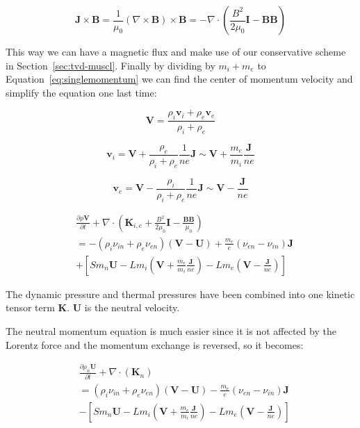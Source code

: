 \documentclass[12pt,upcase]{umlthesis}
\begin{document}
\begin{equation}
	\textbf{J} \times \textbf{B} = \frac{1}{\mu_0} (\nabla \times \textbf{B}) \times \textbf{B} = -\nabla \cdot (\frac{B^2}{2\mu_0}\textbf{I} - \textbf{BB})
\end{equation}

This way we can have a magnetic flux and make use of our conservative scheme in Section~\ref{sec:tvd-muscl}. Finally by dividing by $m_i+m_e$ to Equation~\ref{eq:singlemomentum} we can find the center of momentum velocity and simplify the equation one last time:

\begin{equation}
	\textbf{V} = \frac{\rho_i \textbf{v}_i + \rho_e \textbf{v}_e}{\rho_i+\rho_e}
\end{equation}

\begin{equation}\label{eq:vi}
	\textbf{v}_i = \textbf{V} + \frac{\rho_e}{\rho_i+\rho_e} \frac{1}{n e} \textbf{J} \sim \textbf{V} + \frac{m_e}{m_i} \frac{\textbf{J}}{n e} 
\end{equation}

\begin{equation}\label{eq:ve}
	\textbf{v}_e = \textbf{V} - \frac{\rho_i}{\rho_i+\rho_e} \frac{1}{n e} \textbf{J} \sim \textbf{V} -\frac{\textbf{J} }{n e}
\end{equation}

\begin{equation}\label{eq:momentumcom}
\begin{aligned}
	&\frac{\partial \rho \textbf{V}}{\partial t} + \nabla \cdot (\textbf{K}_{i,e} + \frac{B^2}{2\mu_0}\textbf{I} - \frac{\textbf{BB}}{\mu_0}) \\
	&= - (\rho_i \nu_{in} + \rho_e \nu_{en})(\textbf{V} - \textbf{U}) + \frac{m_e}{e}(\nu_{en}-\nu_{in}) \textbf{J} \\
	& + [S m_n \textbf{U} - L m_i (\textbf{V} + \frac{m_e}{m_i} \frac{\textbf{J}}{n e})- L m_e (\textbf{V} -\frac{\textbf{J}}{n e})]
\end{aligned}
\end{equation}

The dynamic pressure and thermal pressures have been combined into one kinetic tensor term $\textbf{K}$. $\textbf{U}$ is the neutral velocity.

The neutral momentum equation is much easier since it is not affected by the Lorentz force and the momentum exchange is reversed, so it becomes:

\begin{equation}\label{eq:momentumneutral}
\begin{aligned}
	&\frac{\partial \rho_n \textbf{U}}{\partial t} + \nabla \cdot (\textbf{K}_n) \\
	&= (\rho_i \nu_{in} + \rho_e \nu_{en})(\textbf{V} - \textbf{U}) - \frac{m_e}{e}(\nu_{en}-\nu_{in}) \textbf{J} \\
	& - [S m_n \textbf{U} - L m_i (\textbf{V} + \frac{m_e}{m_i} \frac{\textbf{J}}{n e})- L m_e (\textbf{V} -\frac{\textbf{J}}{n e})]
\end{aligned}
\end{equation}
\end{document}
